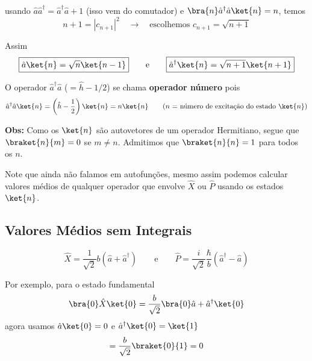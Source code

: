 usando $\hat{a}\hat{a}^\dagger = \hat{a}^\dagger\hat{a} + 1$ (isso vem do comutador) e $\bra{n}\hat{a}^\dagger\hat{a}\ket{n} = n$, temos
\begin{equation}
    n + 1 = |c_{n+1}|^2 \quad \longrightarrow \quad \text{escolhemos } \boxed{c_{n+1} = \sqrt{n+1}}
\label{eq:aula18_cn1}
\end{equation}

Assim
\begin{equation}
    \boxed{\hat{a}\ket{n} = \sqrt{n}\ket{n-1}} \qquad \text{e} \qquad \boxed{\hat{a}^\dagger\ket{n} = \sqrt{n+1}\ket{n+1}}
\label{eq:aula18_a_adagger_action}
\end{equation}

O operador $\hat{a}^\dagger\hat{a}$ ($=\hat{h} - 1/2$) se chama \textbf{operador número} pois
\begin{equation}
    \hat{a}^\dagger\hat{a}\ket{n} = \left( \hat{h} - \frac{1}{2} \right)\ket{n} = n\ket{n} \qquad \text{($n$ = número de excitação do estado $\ket{n}$)}
\label{eq:aula18_operador_numero}
\end{equation}

\textbf{Obs:} Como os $\ket{n}$ são autovetores de um operador Hermitiano, segue que $\braket{n}{m} = 0$ se $m \neq n$. Admitimos que $\braket{n}{n} = 1$ para todos os $n$.

Note que ainda não falamos em autofunções, mesmo assim podemos calcular valores médios de qualquer operador que envolve $\hat{X}$ ou $\hat{P}$ usando os estados $\ket{n}$.

\subsection*{Valores Médios sem Integrais}

\begin{equation}
    \boxed{\hat{X} = \frac{1}{\sqrt{2}}b\left( \hat{a} + \hat{a}^\dagger \right)} \qquad \text{e} \qquad \boxed{\hat{P} = \frac{i}{\sqrt{2}}\frac{\hbar}{b}\left( \hat{a}^\dagger - \hat{a} \right)}
\label{eq:aula18_X_P_em_a}
\end{equation}

Por exemplo, para o estado fundamental
\begin{equation}
    \bra{0}\hat{X}\ket{0} = \frac{b}{\sqrt{2}}\bra{0}\hat{a} + \hat{a}^\dagger\ket{0}
\label{eq:aula18_X_estado_fund}
\end{equation}
agora usamos $\hat{a}\ket{0} = 0$ e $\hat{a}^\dagger\ket{0} = \ket{1}$
\begin{equation}
    = \frac{b}{\sqrt{2}}\braket{0}{1} = 0
\label{eq:aula18_X_estado_fund_zero}
\end{equation}


